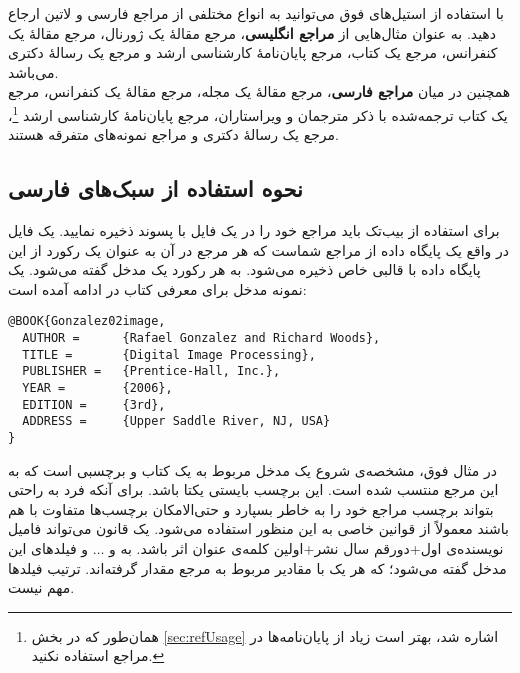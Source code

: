 با استفاده از استیل‌های فوق می‌توانید به انواع مختلفی از مراجع فارسی و لاتین ارجاع دهید.
به عنوان مثال‌هایی از
\textbf{مراجع انگلیسی}،
مرجع
\cite{Baker02limits}
مقالهٔ یک ژورنال، مرجع
\cite{Amintoosi09video}
مقالهٔ یک کنفرانس، مرجع
\cite{Gonzalez02book}
یک کتاب، مرجع
\cite{Khalighi07MscThesis}
پایان‌نامهٔ کارشناسی ارشد و مرجع
\cite{Borman04thesis}
یک رسالهٔ دکتری می‌باشد.\\
همچنین در میان
\textbf{مراجع فارسی}،
مرجع
\cite{Vahedi87}
مقالهٔ یک مجله، مرجع
\cite{Amintoosi87afzayesh}
مقالهٔ یک کنفرانس، مرجع
\cite{Pedram80osool}
یک کتاب ترجمه‌شده با ذکر مترجمان و ویراستاران، مرجع
\cite{Pourmousa88mscThesis}
پایان‌نامهٔ کارشناسی ارشد%
\footnote{همان‌طور که در بخش
\ref{sec:refUsage}
اشاره شد، بهتر است زیاد از پایان‌نامه‌ها در مراجع استفاده نکنید.}،
مرجع
\cite{Omidali82phdThesis}
یک رسالهٔ دکتری و مراجع
\cite{persianbib87userguide, Khalighi87xepersian}
نمونه‌های متفرقه هستند.

\subsection{ نحوه استفاده از سبک‌های فارسی}
برای استفاده از بیب‌تک باید مراجع خود را در یک فایل با پسوند  ذخیره نمایید. یک فایل  در واقع یک پایگاه داده از مراجع  شماست که هر مرجع در آن به عنوان یک رکورد از این پایگاه داده
با قالبی خاص ذخیره می‌شود. به هر رکورد یک مدخل گفته می‌شود. یک نمونه مدخل برای معرفی کتاب  در ادامه آمده است:

\singlespacing
\begin{LTR}
\begin{verbatim}
@BOOK{Gonzalez02image,
  AUTHOR =      {Rafael Gonzalez and Richard Woods},
  TITLE =       {Digital Image Processing},
  PUBLISHER =   {Prentice-Hall, Inc.},
  YEAR =        {2006},
  EDITION =     {3rd},
  ADDRESS =     {Upper Saddle River, NJ, USA}
}
\end{verbatim}
\end{LTR}
\doublespacing

در مثال فوق،  مشخصه‌ی شروع یک مدخل مربوط به یک کتاب و  برچسبی است که به این مرجع منتسب شده است.
 این برچسب بایستی یکتا باشد. برای آنکه فرد به راحتی بتواند برچسب مراجع خود را به خاطر بسپارد و حتی‌الامکان برچسب‌ها متفاوت با هم باشند معمولاً از قوانین خاصی به این منظور استفاده می‌شود. یک قانون می‌تواند فامیل نویسنده‌ی اول+دورقم سال نشر+اولین کلمه‌ی عنوان اثر باشد. به  و $\dots$ و  فیلدهای این مدخل گفته می‌شود؛ که هر یک با مقادیر مربوط به مرجع مقدار گرفته‌اند. ترتیب فیلدها مهم نیست. 

